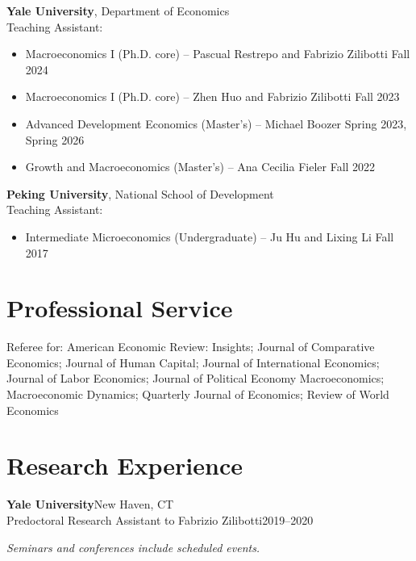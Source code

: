 \documentclass[10pt,letterpaper]{article}
\newcommand{\cventry}[4]{\textbf{#1}\hfill #2\\#3\hfill #4\par}
\begin{document}
\textbf{Yale University}, Department of Economics \\
Teaching Assistant:
\begin{itemize}[noitemsep, topsep=0pt]
    \item Macroeconomics I (Ph.D. core) -- Pascual Restrepo and Fabrizio Zilibotti \hfill Fall 2024
    \item Macroeconomics I (Ph.D. core) -- Zhen Huo and Fabrizio Zilibotti \hfill Fall 2023
    \item Advanced Development Economics (Master's) -- Michael Boozer \hfill Spring 2023, Spring 2026
    \item Growth and Macroeconomics (Master's) -- Ana Cecilia Fieler \hfill Fall 2022
\end{itemize}

\vspace{6pt}

\textbf{Peking University}, National School of Development \\
Teaching Assistant:
\begin{itemize}[noitemsep, topsep=0pt]
    \item Intermediate Microeconomics (Undergraduate) -- Ju Hu and Lixing Li \hfill Fall 2017
\end{itemize}

\section*{Professional Service}

Referee for: American Economic Review: Insights; Journal of Comparative Economics; Journal of Human Capital; Journal of International Economics; Journal of Labor Economics; Journal of Political Economy Macroeconomics; Macroeconomic Dynamics; Quarterly Journal of Economics; Review of World Economics

\section*{Research Experience}

\cventry{Yale University}{New Haven, CT}
    {Predoctoral Research Assistant to Fabrizio Zilibotti}{2019--2020}

\vspace{10pt}
\textit{Seminars and conferences include scheduled events.}
\end{document}
